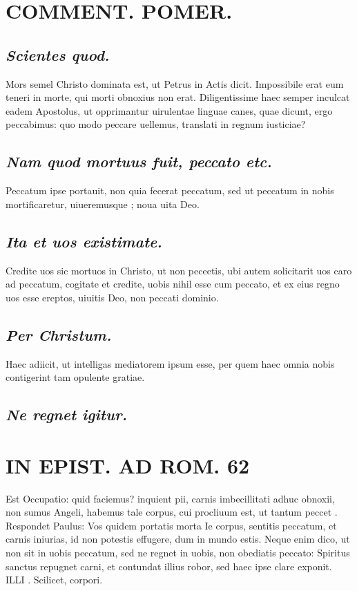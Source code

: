 \documentclass{article}
\begin{document}
\begin{pages}
\section*{COMMENT. POMER.  }
{}
\subsection*{\textit{Scientes quod. }}\pstart Mors semel Christo dominata est, ut Petrus in Actis dicit. Impossibile erat eum teneri in morte, qui morti obnoxius non erat. Diligentissime haec semper inculcat eadem Apostolus, ut opprimantur uirulentae linguae canes, quae dicunt, ergo peccabimus: quo modo peccare uellemus, translati in regnum iusticiae?  \pend
{}
{}
\subsection*{\textit{Nam quod mortuus fuit, peccato etc. }}\pstart Peccatum ipse portauit, non quia fecerat peccatum, sed ut peccatum in nobis mortificaretur, uiueremusque ; noua uita Deo.   \pend
{}
{}
\subsection*{\textit{Ita et uos existimate. }}\pstart Credite uos sic mortuos in Christo, ut non peceetis, ubi autem solicitarit uos caro ad peccatum, cogitate et credite, uobis nihil esse cum peccato, et ex eius regno uos esse ereptos, uiuitis Deo, non peccati dominio.  \pend
{}
{}
\subsection*{\textit{Per Christum. }}\pstart Haec adiicit, ut intelligas mediatorem ipsum esse, per quem haec omnia nobis contigerint tam opulente gratiae.   \pend
{}
{}
\subsection*{\textit{Ne regnet igitur. }}
\section*{IN EPIST. AD ROM.  62 }
\marginpar{[ p.]}\pstart Est Occupatio: quid faciemus? inquient pii, carnis imbecillitati adhuc obnoxii, non sumus Angeli, habemus tale corpus, cui procliuum est, ut tantum peccet . Respondet Paulus: Vos quidem portatis morta Ie corpus, sentitis peccatum, et carnis iniurias, id non potestis effugere, dum in mundo estis. Neque enim dico, ut non sit in uobis peccatum, sed ne regnet in uobis, non obediatis peccato: Spiritus sanctus repugnet carni, et contundat illius robor, sed haec ipse clare exponit. ILLI . Scilicet, corpori.   \pend
{}
{}

\end{pages}
\end{document}
